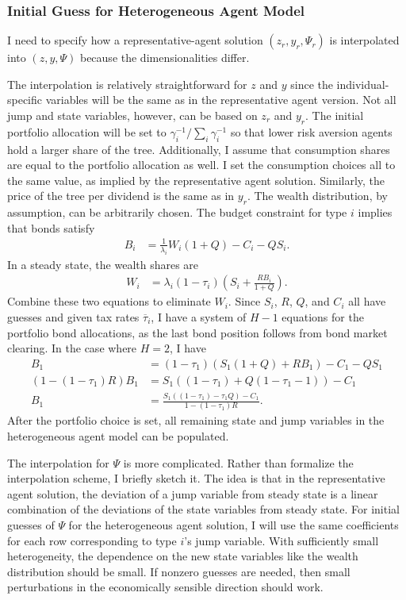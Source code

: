 \documentclass[12 pt, oneside]{article}
\theoremstyle{definition}
\theoremstyle{definition}
\theoremstyle{definition}
\begin{document}
\subsubsection{Initial Guess for Heterogeneous Agent Model}
I need to specify how a representative-agent solution $(z_r, y_r, \Psi_r)$ is interpolated into $(z, y, \Psi)$ because the dimensionalities differ.

The interpolation is relatively straightforward for $z$ and $y$ since
the individual-specific variables will be the same as in the representative agent version. Not all jump and state variables, however, can be
based on $z_r$ and $y_r$.
The initial portfolio allocation will be set to $\gamma_i^{-1} / \sum_i \gamma_i^{-1}$ so that lower risk aversion agents hold a larger share of the tree. Additionally, I assume that consumption shares are equal to the portfolio allocation as well.
I set the consumption choices all to the same value, as implied by the representative agent solution. Similarly, the price of the tree per dividend is the same as in $y_r$. The wealth distribution, by assumption, can be arbitrarily chosen. The budget constraint for type $i$ implies that bonds satisfy
\begin{align*}
  B_i & = \frac{1}{\lambda_i}W_i(1 + Q) - C_i - Q S_i.
\end{align*}
In a steady state, the wealth shares are
\begin{align*}
  W_i & = \lambda_i(1 - \tau_i)\left(S_i + \frac{R B_i}{1 + Q}\right).
\end{align*}
Combine these two equations to eliminate $W_i$. Since $S_i$, $R$, $Q$, and $C_i$ all have guesses and given tax rates $\overline{\tau}_i$, I have a system of $H - 1$ equations for the portfolio bond allocations, as the last bond position follows from bond market clearing.
In the case where $H = 2$, I have
\begin{align*}
  B_1 & = (1 - \tau_1)(S_1 (1 + Q) + R B_1) - C_1 - Q S_1\\
  (1 - (1 - \tau_1) R) B_1 & = S_1((1 - \tau_1) + Q(1 - \tau_1 - 1)) - C_1\\
  B_1 & = \frac{S_1((1 - \tau_1) - \tau_1 Q) - C_1}{1 - (1 - \tau_1)R}.
\end{align*}
After the portfolio choice is set, all remaining state and jump variables in the heterogeneous agent model can be populated.

The interpolation for $\Psi$ is more complicated. Rather than formalize the interpolation scheme, I briefly sketch it. The idea is that in the representative agent solution, the deviation of a jump variable from steady state is a linear combination of the deviations of the state variables from steady state. For initial guesses of $\Psi$ for the heterogeneous agent solution, I will use the same coefficients for each row corresponding to type $i$'s jump variable. With sufficiently small heterogeneity, the dependence on the new state variables like the wealth distribution should be small. If nonzero guesses are needed, then small perturbations in the economically sensible direction should work.
\end{document}
